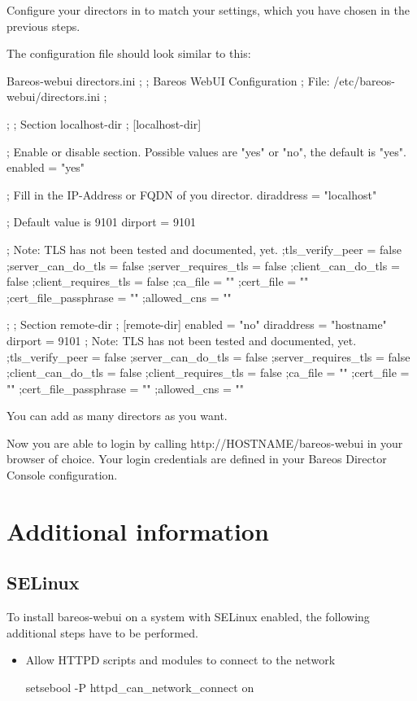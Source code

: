 Configure your directors in  to match your settings, which you have chosen in the previous steps.

The configuration file  should look similar to this:

\begin{bconfig}{Bareos-webui directors.ini}
;
; Bareos WebUI Configuration
; File: /etc/bareos-webui/directors.ini
;

;
; Section localhost-dir
;
[localhost-dir]

; Enable or disable section. Possible values are "yes" or "no", the default is "yes".
enabled = "yes"

; Fill in the IP-Address or FQDN of you director.
diraddress = "localhost"

; Default value is 9101
dirport = 9101

; Note: TLS has not been tested and documented, yet.
;tls_verify_peer = false
;server_can_do_tls = false
;server_requires_tls = false
;client_can_do_tls = false
;client_requires_tls = false
;ca_file = ""
;cert_file = ""
;cert_file_passphrase = ""
;allowed_cns = ""

;
; Section remote-dir
;
[remote-dir]
enabled = "no"
diraddress = "hostname"
dirport = 9101
; Note: TLS has not been tested and documented, yet.
;tls_verify_peer = false
;server_can_do_tls = false
;server_requires_tls = false
;client_can_do_tls = false
;client_requires_tls = false
;ca_file = ""
;cert_file = ""
;cert_file_passphrase = ""
;allowed_cns = ""
\end{bconfig}

You can add as many directors as you want.

Now you are able to login by calling http://HOSTNAME/bareos-webui in your browser of choice. Your login credentials are defined in your Bareos Director Console configuration.

\section{Additional information}

\subsection{SELinux}

To install bareos-webui on a system with SELinux enabled, the following additional steps have to be performed.
\begin{itemize}
 \item Allow HTTPD scripts and modules to connect to the network
\begin{commands}{}
setsebool -P httpd_can_network_connect on
\end{commands}
\end{itemize}

